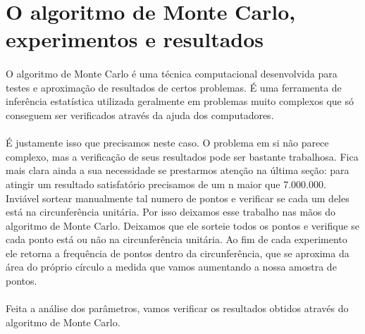 \documentclass{article}
\begin{document}
    \section{O algoritmo de Monte Carlo, experimentos e resultados}
    \paragraph{} O algoritmo de Monte Carlo é uma técnica computacional desenvolvida para testes e aproximação de resultados de certos problemas. É uma ferramenta de inferência estatística utilizada geralmente em problemas muito complexos que só conseguem ser verificados através da ajuda dos computadores.
    \paragraph{} É justamente isso que precisamos neste caso. O problema em si não parece complexo, mas a verificação de seus resultados pode ser bastante trabalhosa. Fica mais clara ainda a sua necessidade se prestarmos atenção na última seção: para atingir um resultado satisfatório precisamos de um n maior que 7.000.000. Inviável sortear manualmente tal numero de pontos e verificar se cada um deles está na circunferência unitária. Por isso deixamos esse trabalho nas mãos do algoritmo de Monte Carlo. Deixamos que ele sorteie todos os pontos e verifique se cada ponto está ou não na circunferência unitária. Ao fim de cada experimento ele retorna a frequência de pontos dentro da circunferência, que se aproxima da área do próprio círculo a medida que vamos aumentando a nossa amostra de pontos.
    \paragraph{} Feita a análise dos parâmetros, vamos verificar os resultados obtidos através do algoritmo de Monte Carlo.
    
\end{document}
